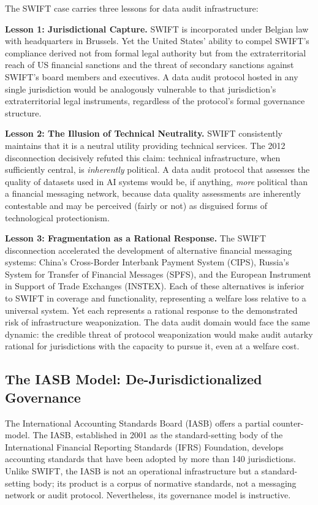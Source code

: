\documentclass[12pt,a4paper]{ctexart}
\theoremstyle{definition}
\theoremstyle{remark}
\begin{document}
The SWIFT case carries three lessons for data audit infrastructure:

\textbf{Lesson 1: Jurisdictional Capture.} SWIFT is incorporated under Belgian law with headquarters in Brussels. Yet the United States' ability to compel SWIFT's compliance derived not from formal legal authority but from the extraterritorial reach of US financial sanctions and the threat of secondary sanctions against SWIFT's board members and executives. A data audit protocol hosted in any single jurisdiction would be analogously vulnerable to that jurisdiction's extraterritorial legal instruments, regardless of the protocol's formal governance structure.

\textbf{Lesson 2: The Illusion of Technical Neutrality.} SWIFT consistently maintains that it is a neutral utility providing technical services. The 2012 disconnection decisively refuted this claim: technical infrastructure, when sufficiently central, is \textit{inherently} political. A data audit protocol that assesses the quality of datasets used in AI systems would be, if anything, \textit{more} political than a financial messaging network, because data quality assessments are inherently contestable and may be perceived (fairly or not) as disguised forms of technological protectionism.

\textbf{Lesson 3: Fragmentation as a Rational Response.} The SWIFT disconnection accelerated the development of alternative financial messaging systems: China's Cross-Border Interbank Payment System (CIPS), Russia's System for Transfer of Financial Messages (SPFS), and the European Instrument in Support of Trade Exchanges (INSTEX). Each of these alternatives is inferior to SWIFT in coverage and functionality, representing a welfare loss relative to a universal system. Yet each represents a rational response to the demonstrated risk of infrastructure weaponization. The data audit domain would face the same dynamic: the credible threat of protocol weaponization would make audit autarky rational for jurisdictions with the capacity to pursue it, even at a welfare cost.

\subsection{The IASB Model: De-Jurisdictionalized Governance}

The International Accounting Standards Board (IASB) offers a partial counter-model. The IASB, established in 2001 as the standard-setting body of the International Financial Reporting Standards (IFRS) Foundation, develops accounting standards that have been adopted by more than 140 jurisdictions. Unlike SWIFT, the IASB is not an operational infrastructure but a standard-setting body; its product is a corpus of normative standards, not a messaging network or audit protocol. Nevertheless, its governance model is instructive.
\end{document}
